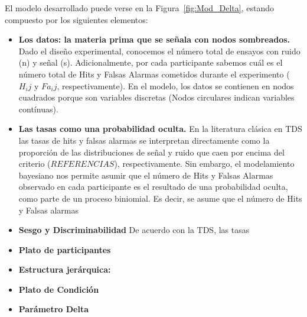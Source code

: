 El modelo desarrollado puede verse en la Figura~\ref{fig:Mod_Delta}, estando compuesto por los siguientes elementos:

\begin{itemize}
\item \textbf{Los datos: la materia prima que se señala con nodos sombreados.}
Dado el diseño experimental, conocemos el número total de ensayos con ruido (n) y señal (s). Adicionalmente, por cada participante sabemos cuál es el número total de Hits y Falsas Alarmas cometidos durante el experimento ($H_ij$ y $Fa_ij$, respectivamente). En el modelo, los datos se contienen en nodos cuadrados porque son variables discretas (Nodos circulares indican variables contínuas).\\

\item \textbf{Las tasas como una probabilidad oculta.} 
En la literatura clásica en TDS las tasas de hits y falsas alarmas se interpretan directamente como la proporción de las distribuciones de señal y ruido que caen por encima del criterio ($REFERENCIAS$), respectivamente. Sin embargo, el modelamiento bayesiano nos permite asumir que el número de Hits y Falsas Alarmas observado en cada participante es el resultado de una probabilidad oculta, como parte de un proceso biniomial. Es decir, se asume que el número de Hits y Falsas alarmas

\item \textbf{Sesgo y Discriminabilidad}
De acuerdo con la TDS, las tasas 

\item \textbf{Plato de participantes} 

\item \textbf{Estructura jerárquica:}

\item \textbf{Plato de Condición}

\item \textbf{Parámetro Delta}
\end{itemize} 

